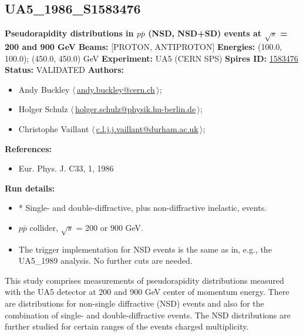 \subsection[UA5\_1986\_S1583476]{UA5\_1986\_S1583476\,\cite{Alner:1986xu}}
\textbf{Pseudorapidity distributions in $p\bar{p}$ (NSD, NSD+SD) events at \ensuremath{\sqrt{s}} = 200 and 900 GeV}\newline
\textbf{Beams:} [PROTON, ANTIPROTON] \newline
\textbf{Energies:} (100.0, 100.0); (450.0, 450.0) GeV \newline
\textbf{Experiment:} UA5 (CERN SPS) \newline
\textbf{Spires ID:} \href{http://www.slac.stanford.edu/spires/find/hep/www?rawcmd=key+1583476}{1583476}\newline
\textbf{Status:} VALIDATED\newline
\textbf{Authors:}
\begin{itemize}
  \item Andy Buckley $\langle\,$\href{mailto:andy.buckley@cern.ch}{andy.buckley@cern.ch}$\,\rangle$;
  \item Holger Schulz $\langle\,$\href{mailto:holger.schulz@physik.hu-berlin.de}{holger.schulz@physik.hu-berlin.de}$\,\rangle$;
  \item Christophe Vaillant $\langle\,$\href{mailto:c.l.j.j.vaillant@durham.ac.uk}{c.l.j.j.vaillant@durham.ac.uk}$\,\rangle$;
\end{itemize}
\textbf{References:}
\begin{itemize}
  \item Eur. Phys. J. C33, 1, 1986
\end{itemize}
\textbf{Run details:}
\begin{itemize}

  \item * Single- and double-diffractive, plus non-diffractive inelastic, events.
  \item $p\bar{p}$ collider, \ensuremath{\sqrt{s}} = 200 or 900 GeV.
  \item The trigger implementation for NSD events is the same as in, e.g., the UA5_1989 analysis. No further cuts are needed.\end{itemize}

\noindent This study comprises measurements of pseudorapidity distributions measured with the UA5 detector at 200 and 900 GeV center of momentum energy. There are distributions for non-single diffractive (NSD) events and also for the combination of single- and double-diffractive events. The NSD distributions are further studied for certain ranges of the events charged multiplicity.

